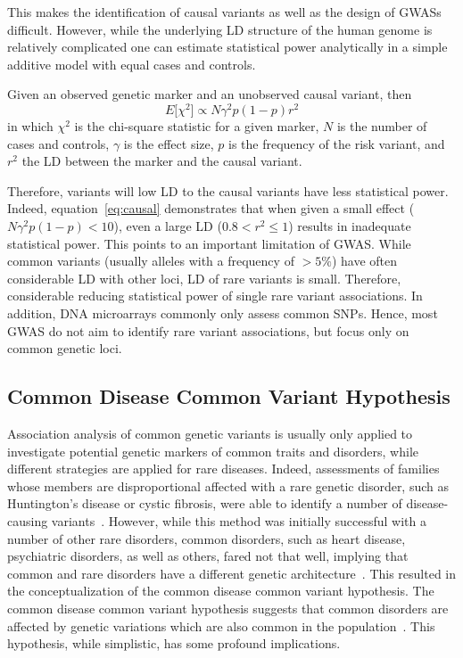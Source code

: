 This makes the identification of causal variants as well as the design of GWASs difficult.
However, while the underlying LD structure of the human genome is relatively complicated one can estimate statistical power analytically in a simple additive model with equal cases and controls.

Given an observed genetic marker and an unobserved causal variant, then
\begin{equation}\label{eq:causal}
  E \lbrack \chi^2 \rbrack \propto N\gamma^2p(1-p)r^2
\end{equation}
in which $\chi^2$ is the chi-square statistic for a given marker, $N$ is the number of cases and controls, $\gamma$ is the effect size, $p$ is the frequency of the risk variant, and $r^2$ the LD between the marker and the causal variant.

Therefore, variants will low LD to the causal variants have less statistical power.
Indeed, equation~\ref{eq:causal} demonstrates that when given a small effect ($N\gamma^2p(1-p) < 10$), even a large LD ($0.8  < r^2 \leq 1$) results in inadequate statistical power.
This points to an important limitation of GWAS.
While common variants (usually alleles with a frequency of $>5\%$) have often considerable LD with other loci, LD of rare variants is small.
Therefore, considerable reducing statistical power of single rare variant associations.
In addition, DNA microarrays commonly only assess common SNPs.
Hence, most GWAS do not aim to identify rare variant associations, but focus only on common genetic loci.

\subsection{Common Disease Common Variant Hypothesis}
\label{sub:common_versus_rare_genetic_variants}

Association analysis of common genetic variants is usually only applied to investigate potential genetic markers of common traits and disorders, while different strategies are applied for rare diseases.
Indeed, assessments of families whose members are disproportional affected with a rare genetic disorder, such as Huntington's disease or cystic fibrosis, were able to identify a number of disease-causing variants~\cite{Kerem1989}.
However, while this method was initially successful with a number of other rare disorders, common disorders, such as heart disease, psychiatric disorders, as well as others, fared not that well,  
implying that common and rare disorders have a different genetic architecture~\cite{Hirschhorn2005}.
This resulted in the conceptualization of the common disease common variant hypothesis.
The common disease common variant hypothesis suggests that common disorders are affected by genetic variations which are also common in the population~\cite{Schork2010}.
This hypothesis, while simplistic, has some profound implications.


